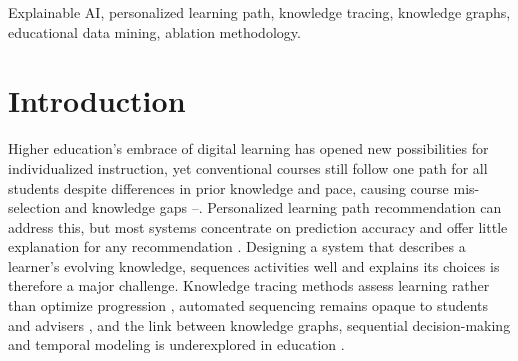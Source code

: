 \documentclass[conference]{IEEEtran}
\begin{document}
\begin{abstract}
Digital learning platforms generate large volumes of student interaction data, yet
educational recommender systems offer little transparency, rarely model forgetting, and are
seldom evaluated in a way that shows which components actually contribute. This paper
proposes an Explainable AI (XAI)-based learning path recommender combining a
knowledge-graph-enhanced Deep Knowledge Tracing module, a prerequisite-constrained planner
and a priority-backtracking explanation module. On the Open University Learning Analytics
Dataset (OULAD), under five-fold cross-validation grouped by student, it attains AUC-ROC
$0.9538 \pm 0.0019$ and RMSE $0.2621 \pm 0.0026$, exceeding DKT ($p = 0.0009$) and a GNN
baseline ($p = 0.022$) after Holm correction. The central finding concerns evaluation:
removing the knowledge graph changes accuracy by only $-0.0001$ ($p = 0.77$), because
accuracy is scored at assessment positions and only 89 of 237 concepts carry assessments.
Under a cold-concept protocol that withholds assessments for a subset of concepts and scores
only those, the same graph improves accuracy by $+0.0325$ ($p = 0.0003$, Cohen's
$d = 5.06$), winning on every fold. The planner makes zero prerequisite violations across
906 decisions evaluated against real learner behaviour, and explanations are assessed by
objective fidelity, sufficiency and stability rather than subjective rating.
\end{abstract}

\begin{IEEEkeywords}
Explainable AI, personalized learning path, knowledge tracing, knowledge graphs,
educational data mining, ablation methodology.
\end{IEEEkeywords}

\section{Introduction}
\label{sec:intro}

Higher education's embrace of digital learning has opened new possibilities for
individualized instruction, yet conventional courses still follow one path for all students
despite differences in prior knowledge and pace, causing course mis-selection and knowledge
gaps \cite{li2026survey}--\cite{kuzilek2017oulad}. Personalized learning path
recommendation can address this, but most systems concentrate on prediction accuracy and
offer little explanation for any recommendation \cite{corbett1994knowledge}. Designing a
system that describes a learner's evolving knowledge, sequences activities well and explains
its choices is therefore a major challenge. Knowledge
tracing methods assess learning rather than optimize progression \cite{piech2015dkt,
zhang2017dkvmn}, automated sequencing remains opaque to students and advisers
\cite{ghosh2020akt}\cite{shen2021lpkt}, and the link between knowledge graphs, sequential
decision-making and temporal modeling is underexplored in education \cite{kipf2017gcn,
mnih2015dqn}.
\end{document}
